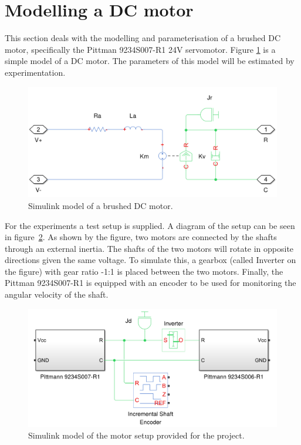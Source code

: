 \section{Modelling a DC motor}
This section deals with the modelling and parameterisation of a brushed DC motor, specifically the Pittman 9234S007-R1 24V servomotor\cite{pittmann}.
Figure \ref{fig:dcmotormodel} is a simple model of a DC motor.
The parameters of this model will be estimated by experimentation.

\begin{figure}[!h]
	\centering
	\includegraphics[width=.75\linewidth]{graphics/dcmotormodel.png}
	\caption{Simulink model of a brushed DC motor.}
	\label{fig:dcmotormodel}
\end{figure}

For the experiments a test setup is supplied. 
A diagram of the setup can be seen in figure~\ref{fig:motorsetup}. 
As shown by the figure, two motors are connected by the shafts through an external inertia.
The shafts of the two motors will rotate in opposite directions given the same voltage.
To simulate this, a gearbox (called Inverter on the figure) with gear ratio -1:1 is placed between the two motors.
Finally, the Pittman 9234S007-R1 is equipped with an encoder to be used for monitoring the angular velocity of the shaft.


\begin{figure}[!h]
	\centering
	\includegraphics[width=.8\linewidth]{graphics/motorsetup.png}
	\caption{Simulink model of the motor setup provided for the project.}
	\label{fig:motorsetup}
\end{figure}


